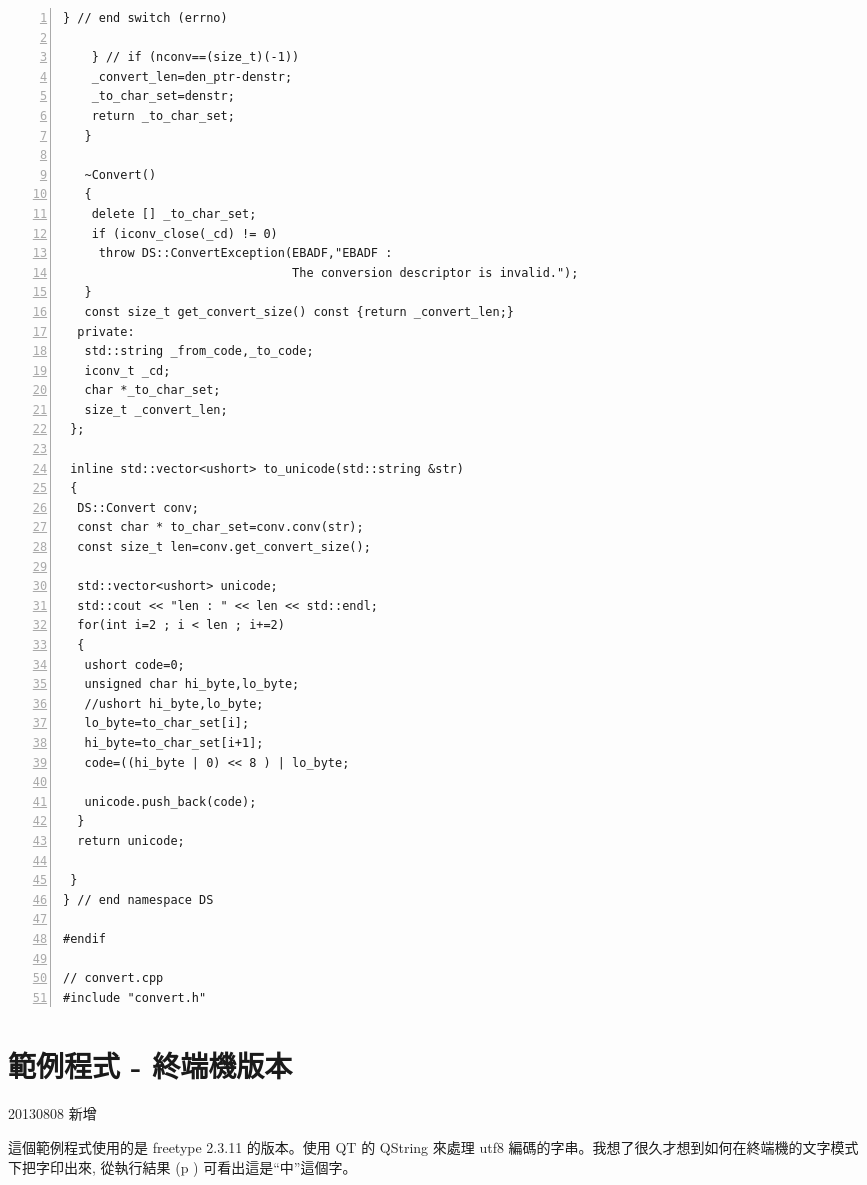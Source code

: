 \documentclass[12pt,a4]{article}
\begin{document}
\begin{CJK}{UTF8}{bsmi}
\begin{Verbatim}[commandchars=@\^?,numbers=left]
     } // end switch (errno)

    } // if (nconv==(size_t)(-1))
    _convert_len=den_ptr-denstr;
    _to_char_set=denstr;
    return _to_char_set;
   }

   ~Convert()
   {
    delete [] _to_char_set;
    if (iconv_close(_cd) != 0)
     throw DS::ConvertException(EBADF,"EBADF : 
                                The conversion descriptor is invalid.");
   }
   const size_t get_convert_size() const {return _convert_len;}
  private:
   std::string _from_code,_to_code;
   iconv_t _cd;
   char *_to_char_set;
   size_t _convert_len;
 };

 inline std::vector<ushort> to_unicode(std::string &str)
 {
  DS::Convert conv;
  const char * to_char_set=conv.conv(str);
  const size_t len=conv.get_convert_size();

  std::vector<ushort> unicode;
  std::cout << "len : " << len << std::endl;
  for(int i=2 ; i < len ; i+=2)
  {
   ushort code=0;
   unsigned char hi_byte,lo_byte;
   //ushort hi_byte,lo_byte;
   lo_byte=to_char_set[i];
   hi_byte=to_char_set[i+1];
   code=((hi_byte | 0) << 8 ) | lo_byte;

   unicode.push_back(code);
  }
  return unicode;

 }
} // end namespace DS

#endif

// convert.cpp
#include "convert.h"
\end{Verbatim}

\newpage
\section{範例程式 - 終端機版本}
20130808 新增 

這個範例程式使用的是 freetype 2.3.11 的版本。使用 QT 的 QString 來處理 utf8
編碼的字串。我想了很久才想到如何在終端機的文字模式下把字印出來, 從執行結果 (p \pageref{lst::result})
可看出這是``中''這個字。





\end{CJK}
\end{document}
